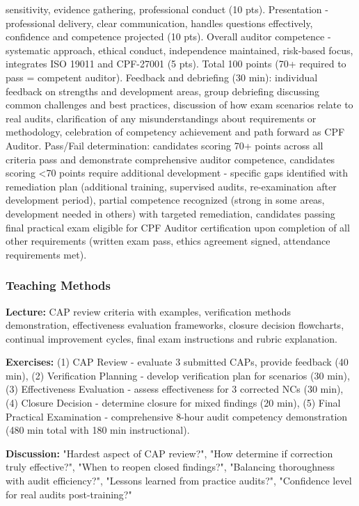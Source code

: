 \documentclass[11pt,a4paper]{article}
\begin{document}
sensitivity, evidence gathering, professional conduct (10 pts). Presentation - professional delivery, clear communication, handles questions effectively, confidence and competence projected (10 pts). Overall auditor competence - systematic approach, ethical conduct, independence maintained, risk-based focus, integrates ISO 19011 and CPF-27001 (5 pts). Total 100 points (70+ required to pass = competent auditor). Feedback and debriefing (30 min): individual feedback on strengths and development areas, group debriefing discussing common challenges and best practices, discussion of how exam scenarios relate to real audits, clarification of any misunderstandings about requirements or methodology, celebration of competency achievement and path forward as CPF Auditor. Pass/Fail determination: candidates scoring 70+ points across all criteria pass and demonstrate comprehensive auditor competence, candidates scoring <70 points require additional development - specific gaps identified with remediation plan (additional training, supervised audits, re-examination after development period), partial competence recognized (strong in some areas, development needed in others) with targeted remediation, candidates passing final practical exam eligible for CPF Auditor certification upon completion of all other requirements (written exam pass, ethics agreement signed, attendance requirements met).

\subsubsection{Teaching Methods}
\textbf{Lecture:} CAP review criteria with examples, verification methods demonstration, effectiveness evaluation frameworks, closure decision flowcharts, continual improvement cycles, final exam instructions and rubric explanation.

\textbf{Exercises:} (1) CAP Review - evaluate 3 submitted CAPs, provide feedback (40 min), (2) Verification Planning - develop verification plan for scenarios (30 min), (3) Effectiveness Evaluation - assess effectiveness for 3 corrected NCs (30 min), (4) Closure Decision - determine closure for mixed findings (20 min), (5) Final Practical Examination - comprehensive 8-hour audit competency demonstration (480 min total with 180 min instructional).

\textbf{Discussion:} "Hardest aspect of CAP review?", "How determine if correction truly effective?", "When to reopen closed findings?", "Balancing thoroughness with audit efficiency?", "Lessons learned from practice audits?", "Confidence level for real audits post-training?"
\end{document}
